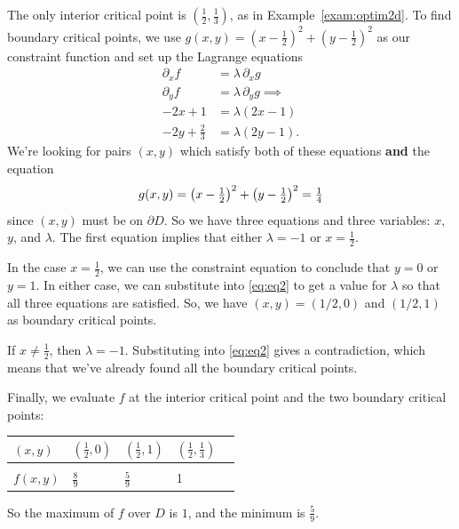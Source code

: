 \documentclass{watsonbook}
\begin{document}
\begin{solution}
  The only interior critical point is
  $\left(\tfrac{1}{2},\tfrac{1}{3}\right)$, as in
  Example~\ref{exam:optim2d}. To find boundary critical points, we
  use
  $g(x,y) = \left(x-\frac{1}{2}\right)^2 + \left(y -
    \frac{1}{2}\right)^2$ as our constraint function and set up the
  Lagrange equations
  \begin{align} \nonumber
    \partial_x f &= \lambda \, \partial_x g \\ \nonumber
    \partial_y f &= \lambda \, \partial_y g \implies \\ 
    -2x + 1 &= \lambda(2x - 1)  \\ \label{eq:eq2}
    -2y + \tfrac{2}{3} &= \lambda(2y-1). 
  \end{align}
  We're looking for pairs $(x,y)$ which satisfy both of these
  equations \textbf{and} the equation
  \begin{equation} 
    g(x,y) = \left(x-\tfrac{1}{2}\right)^2 +
    \left(y-\tfrac{1}{2}\right)^2 = \tfrac{1}{4} \\ 
  \end{equation}
  since
  $(x,y)$ must be on $\partial D$. So we have three equations and three
  variables: $x$, $y$, and $\lambda$. The first equation implies
  that either $\lambda = -1$ or $x = \tfrac{1}{2}$.

  In the case $x = \frac{1}{2}$, we can use the constraint equation
  to conclude that $y = 0$ or $y = 1$. In either case, we can
  substitute into \eqref{eq:eq2} to get a value for $\lambda$ so
  that all three equations are satisfied. So, we have
  $(x,y) = (1/2, 0)$ and $(1/2,1)$ as boundary critical points.

  If $x \neq \tfrac{1}{2}$, then $\lambda = -1$. Substituting into
  \eqref{eq:eq2} gives a contradiction, which means that we've
  already found all the boundary critical points.

  Finally, we evaluate $f$ at the interior critical point and the
  two boundary critical points: \vspace{-12pt}
  \begin{center}
    \begin{tabular}{M{1.2cm}|M{1.2cm}M{1.2cm}M{1.2cm}N}
      $(x,y)$ & $\left(\frac{1}{2}, 0\right)$  & $\left(\frac{1}{2},
                                                 1\right)$ &
                                                             $\left(\frac{1}{2},
                                                             \frac{1}{3} \right)$ &
      \\[12pt] \hline  \\[-8pt] 
      $f(x,y)$ & $\frac{8}{9}$ & $\frac{5}{9}$ & 1 &  \\
    \end{tabular}
  \end{center}
  So the maximum of $f$ over $D$ is $1$, and the minimum is
  $\frac{5}{9}$. 
\end{solution}
\end{document}

